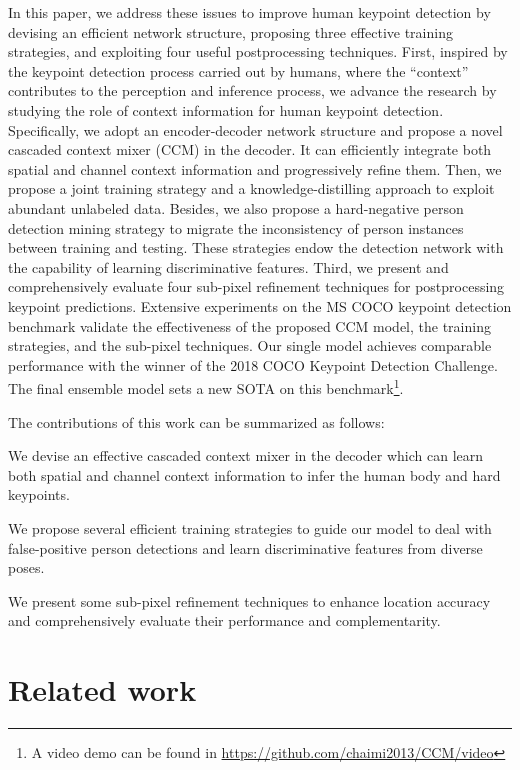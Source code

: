 \documentclass[twocolumn]{svjour3}          \smartqed  \usepackage{natbib}
\begin{document}
In this paper, we address these issues to improve human keypoint detection by devising an efficient network structure, proposing three effective training strategies, and exploiting four useful postprocessing techniques. First, inspired by the keypoint detection process carried out by humans, where the ``context'' contributes to the perception and inference process, we advance the research by studying the role of context information for human keypoint detection. Specifically, we adopt an encoder-decoder network structure and propose a novel cascaded context mixer (CCM) in the decoder. It can efficiently integrate both spatial and channel context information and progressively refine them. Then, we propose a joint training strategy and a knowledge-distilling approach to exploit abundant unlabeled data. Besides, we also propose a hard-negative person detection mining strategy to migrate the inconsistency of person instances between training and testing. These strategies endow the detection network with the capability of learning discriminative features. Third, we present and comprehensively evaluate four sub-pixel refinement techniques for postprocessing keypoint predictions. Extensive experiments on the MS COCO keypoint detection benchmark validate the effectiveness of the proposed CCM model, the training strategies, and the sub-pixel techniques. Our single model achieves comparable performance with the winner of the 2018 COCO Keypoint Detection Challenge. The final ensemble model sets a new SOTA on this benchmark\footnote{A video demo can be found in \url{https://github.com/chaimi2013/CCM/video}}.

The contributions of this work can be summarized as follows:

 We devise an effective cascaded context mixer in the decoder which can learn both spatial and channel context information to infer the human body and hard keypoints.

 We propose several efficient training strategies to guide our model to deal with false-positive person detections and learn discriminative features from diverse poses.

 We present some sub-pixel refinement techniques to enhance location accuracy and comprehensively evaluate their performance and complementarity.


\section{Related work}
\label{sec:relatedwork}
\end{document}
